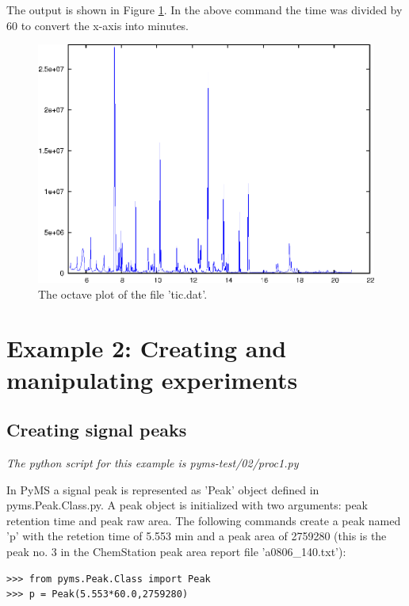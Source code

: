The output is shown in Figure \ref{ticplot}. In the above command the
time was divided by 60 to convert the x-axis into minutes.

\begin{figure}[htp]
\begin{center}
\includegraphics{graphics/tic.eps}
\caption{The octave plot of the file 'tic.dat'.}
\label{ticplot}
\end{center}
\end{figure}

\section{Example 2: Creating and manipulating experiments}

\subsection{Creating signal peaks}

\noindent
{\em The python script for this example is pyms-test/02/proc1.py}

In PyMS a signal peak is represented as 'Peak' object defined in
pyms.Peak.Class.py. A peak object is initialized with two arguments:
peak retention time and peak raw area. The following commands create
a peak named 'p' with the retetion time of 5.553 min and a peak area
of 2759280 (this is the peak no. 3 in the ChemStation peak area report
file 'a0806\_140.txt'):

\begin{verbatim}
>>> from pyms.Peak.Class import Peak
>>> p = Peak(5.553*60.0,2759280)
\end{verbatim}

